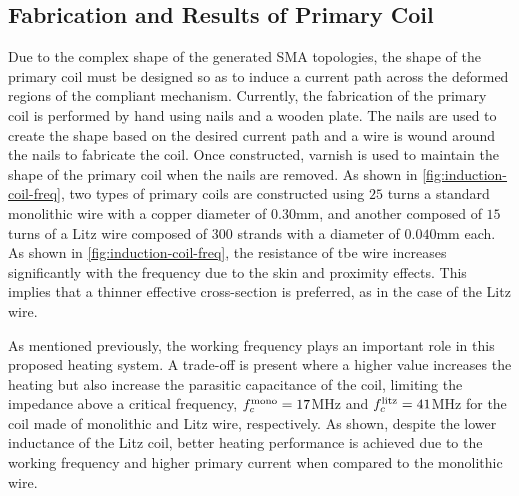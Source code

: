\subsection{Fabrication and Results of Primary Coil}
Due to the complex shape of the generated SMA topologies, the shape of the primary coil must be designed so as to induce a current path across the deformed regions of the compliant mechanism. Currently, the fabrication of the primary coil is performed by hand using nails and a wooden plate. The nails are used to create the shape based on the desired current path and a wire is wound around the nails to fabricate the coil. Once constructed, varnish is used to maintain the shape of the primary coil when the nails are removed. As shown in \cref{fig:induction-coil-freq}, two types of primary coils are constructed using $25$ turns a standard monolithic wire with a copper diameter of $0.30$mm, and another composed of $15$ turns of a Litz wire composed of $300$ strands with a diameter of $0.040$mm each. As shown in \cref{fig:induction-coil-freq}, the resistance of tbe wire increases significantly with the frequency due to the skin and proximity effects. This implies that a thinner effective cross-section is preferred, as in the case of the Litz wire.

As mentioned previously, the working frequency plays an important role in this proposed heating system. A trade-off is present where a higher value increases the heating but also increase the parasitic capacitance of the coil, limiting the impedance above a critical frequency, $f_c^\text{mono}=17$MHz and $f_c^\text{litz}=41$MHz for the coil made of monolithic and Litz wire, respectively. As shown, despite the lower inductance of the Litz coil, better heating performance is achieved due to the working frequency and higher primary current when compared to the monolithic wire.

